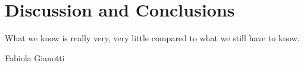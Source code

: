 \chapter{Discussion and Conclusions}
\label{chapter:discussion}

\epigraph{What we know is really very, very little compared to what we still have to know.}{Fabiola Gianotti}




